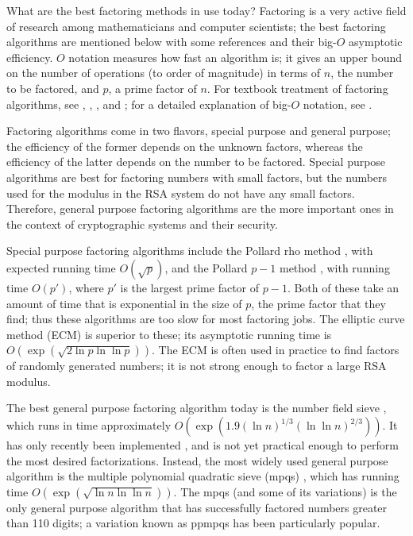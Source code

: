 {What are the best factoring methods in use today?}
Factoring is a very active field of research among mathematicians and
computer scientists; the best factoring algorithms are mentioned below 
with some references and their big-$O$ asymptotic efficiency. $O$ notation 
measures how fast an algorithm is; it gives an upper bound on the number 
of operations (to order of magnitude) in terms of $n$, the number to be 
factored, and $p$, a prime factor of $n$. For textbook treatment of 
factoring algorithms, see \cite{knuth}, \cite{koblitz-book}, 
\cite{lenstra-survey}, and \cite{bressoud}; for a detailed explanation of 
big-$O$ notation, see \cite{cormen-l-rivest}.

Factoring algorithms come in two flavors, special purpose and general
purpose; the efficiency of the former depends on the unknown factors, 
whereas the efficiency of the latter depends on the number to be factored. 
Special purpose algorithms are best for factoring numbers with small 
factors, but the numbers used for the modulus in the RSA system do not 
have any small factors. Therefore, general purpose factoring algorithms 
are the more important ones in the context of cryptographic systems and 
their security. 

Special purpose factoring algorithms include the Pollard rho method
\cite{pollard2}, with expected running time $O(\sqrt p)$, and the Pollard 
$p-1$ method \cite{pollard1}, with running time $O(p')$, where $p'$ is the
largest prime factor of $p-1$. Both of these take an amount of time that
is exponential in the size of $p$, the prime factor that they find; thus 
these algorithms are too slow for most factoring jobs. The elliptic curve 
method (ECM) \cite{lenstra-ecm} is superior to these; its asymptotic running 
time is $O(\exp ( \sqrt {2 \ln p \ln \ln p}))$. The ECM is often used in 
practice to find factors of randomly generated numbers; it is not strong  
enough to factor a large RSA modulus.

The best general purpose factoring algorithm today is the number field 
sieve \cite{buhler}, which runs in time approximately 
$O(\exp ( 1.9 (\ln n)^{1/3} (\ln\ln n)^{2/3}) )$. It has only recently 
been implemented \cite{buchmann-nfs}, and is not yet practical enough to 
perform the most desired factorizations. Instead, the most widely used 
general purpose algorithm is the multiple polynomial quad\-ratic sieve 
(mpqs) \cite{silverman-mpqs}, which has running time 
$O(\exp ( \sqrt {\ln n \ln \ln n}))$. The mpqs (and some of its variations) 
is the only general purpose algorithm that has successfully factored 
numbers greater than 110 digits; a variation known as ppmpqs \cite
{lenstra-ppmpqs} has been particularly popular.


